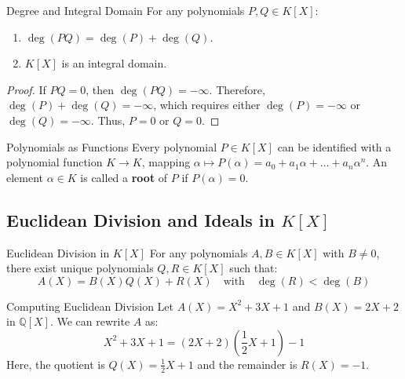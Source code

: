 \documentclass[11pt, a4paper]{article}
\newcommand{\Q}{\mathbb{Q}}
\begin{document}
\begin{proposition}{Degree and Integral Domain}{}
For any polynomials $P, Q \in K[X]$:
\begin{enumerate}
    \item $\deg(PQ) = \deg(P) + \deg(Q)$. 
    \item $K[X]$ is an integral domain. 
\end{enumerate}
\end{proposition}
\begin{proof}
If $PQ = 0$, then $\deg(PQ) = -\infty$. 
Therefore, $\deg(P) + \deg(Q) = -\infty$, which requires either $\deg(P) = -\infty$ or $\deg(Q) = -\infty$. 
Thus, $P = 0$ or $Q = 0$. 
\end{proof}

\begin{remark}{Polynomials as Functions}{}
Every polynomial $P \in K[X]$ can be identified with a polynomial function $K \to K$, mapping $\alpha \mapsto P(\alpha) = a_0 + a_1\alpha + \dots + a_n\alpha^n$. 
An element $\alpha \in K$ is called a \textbf{root} of $P$ if $P(\alpha) = 0$. 
\end{remark}

\subsection{Euclidean Division and Ideals in $K[X]$}

\begin{theorem}{Euclidean Division in $K[X]$}{}
For any polynomials $A, B \in K[X]$ with $B \neq 0$, there exist unique polynomials $Q, R \in K[X]$ such that:
$$ A(X) = B(X)Q(X) + R(X) \quad \text{with} \quad \deg(R) < \deg(B) $$ 
\end{theorem}

\begin{example}{Computing Euclidean Division}{}
Let $A(X) = X^2 + 3X + 1$ and $B(X) = 2X + 2$ in $\Q[X]$. 
We can rewrite $A$ as:
$$ X^2 + 3X + 1 = (2X + 2)\left(\frac{1}{2}X + 1\right) - 1 $$ 
Here, the quotient is $Q(X) = \frac{1}{2}X + 1$ and the remainder is $R(X) = -1$. 
\end{example}
\end{document}
